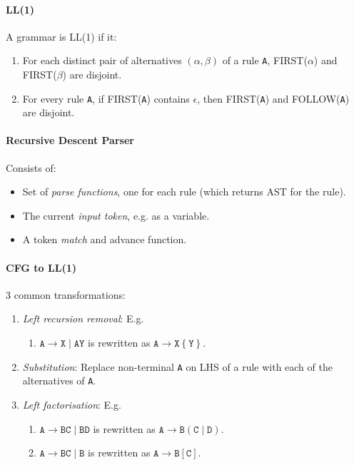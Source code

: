 \documentclass[twocolumn,english]{article}
\begin{document}
\paragraph{LL(1)}

A grammar is LL(1) if it:
\begin{enumerate}
\item For each distinct pair of alternatives $(\alpha,\beta)$ of a rule
\texttt{A}, FIRST($\alpha$) and FIRST($\beta$) are disjoint.
\item For every rule \texttt{A}, if FIRST(\texttt{A}) contains $\epsilon$,
then FIRST(\texttt{A}) and FOLLOW(\texttt{A}) are disjoint.
\end{enumerate}

\paragraph{Recursive Descent Parser}

Consists of:
\begin{itemize}
\item Set of \emph{parse functions}, one for each rule (which returns AST
for the rule).
\item The current \emph{input token}, e.g. as a variable.
\item A token \emph{match} and advance function.
\end{itemize}

\paragraph{CFG to LL(1)}

3 common transformations:
\begin{enumerate}
\item \emph{Left recursion removal}: E.g.
\begin{enumerate}
\item $\texttt{A}\rightarrow\texttt{X}\mid\texttt{AY}$ is rewritten as
$\texttt{A}\rightarrow\texttt{X}\left\{ \texttt{Y}\right\} $.
\end{enumerate}
\item \emph{Substitution}: Replace non-terminal \texttt{A} on LHS of a rule
with each of the alternatives of \texttt{A}.
\item \emph{Left factorisation}: E.g.
\begin{enumerate}
\item $\texttt{A}\rightarrow\texttt{BC}\mid\texttt{BD}$ is rewritten as
$\texttt{A}\rightarrow\texttt{B}\left(\texttt{C}\mid\texttt{D}\right)$.
\item $\texttt{A}\rightarrow\texttt{BC}\mid\texttt{B}$ is rewritten as
$\texttt{A}\rightarrow\texttt{B}\left[\texttt{C}\right]$.
\end{enumerate}
\end{enumerate}
\end{document}
